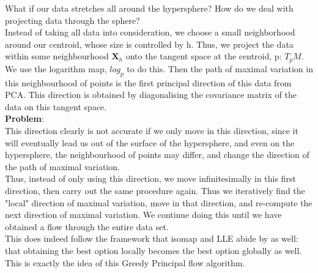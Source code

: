 \documentclass[12pt]{report}
\begin{document}
What if our data stretches all around the hypersphere? How do we deal with projecting
data through the sphere?\\
Instead of taking all data into consideration, we choose a small neighborhood around
our centroid, whose size is controlled by h. Thus, we
project the data within some neighbourhood $\textbf{X}_h$ onto the tangent space 
at the centroid, p: $T_pM$. We use the logarithm map, $log_p$ to do this. Then the path of maximal variation 
in this neighbourhood of points is the first principal direction of this data from PCA. 
This direction is obtained by diagonalising the covariance matrix of the data on this tangent
space. \\
\textbf{Problem}:\\
This direction clearly is not accurate if we only move in this direction,
since it will eventually lead us out of the surface of the hypersphere, and even on the 
hypersphere, the neighbourhood of points may differ, and change the direction 
of the path of maximal variation.\\
Thus, instead of only using this direction, we move infinitesimally in this first direction,
then carry out the same procedure again. Thus we iteratively find the "local"
direction of maximal variation, move in that direction, and re-compute the next direction
of maximal variation. We continue doing this until we have obtained a flow through the
entire data set.\\
This does indeed follow the framework that isomap and LLE abide by
as well: that obtaining the best option locally becomes the best option globally as well. 
This is exactly the idea of this Greedy Principal flow algorithm. 
\end{document}

